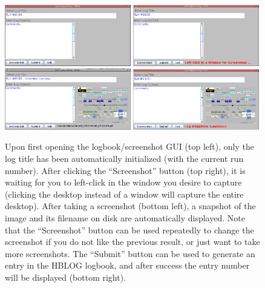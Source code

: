 \documentclass[amsmath,amssymb,notitlepage,11pt]{revtex4}
\begin{document}
    \begin{figure}[htbp]\centering
        \includegraphics[width=0.49\textwidth]{pics/logbookEntry1.png}
        \includegraphics[width=0.49\textwidth]{pics/logbookEntry2.png}
        \includegraphics[width=0.49\textwidth]{pics/logbookEntry3.png}
        \includegraphics[width=0.49\textwidth]{pics/logbookEntry4.png}
        \caption{Upon first opening the logbook/screenshot GUI (top left), only the log title has been automatically initialized (with the current run number).  After clicking the ``Screenshot'' button (top right), it is waiting for you to left-click in the window you desire to capture (clicking the desktop instead of a window will capture the entire desktop).  After taking a screenshot (bottom left), a snapshot of the image and its filename on disk are automatically displayed.  Note that the ``Screenshot'' button can be used repeatedly to change the screenshot if you do not like the previous result, or just want to take more screenshots.  The ``Submit'' button can be used to generate an entry in the HBLOG logbook, and after success the entry number will be displayed (bottom right).\label{fig:logbookEntry}}
\end{figure}
\end{document}
